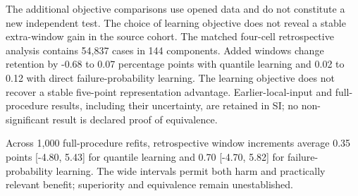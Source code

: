 The additional objective comparisons use opened data and do not constitute a new independent test. The choice of learning objective does not reveal a stable extra-window gain in the source cohort. The matched four-cell retrospective analysis contains 54,837 cases in 144 components. Added windows change retention by -0.68 to 0.07 percentage points with quantile learning and 0.02 to 0.12 with direct failure-probability learning. The learning objective does not recover a stable five-point representation advantage. Earlier-local-input and full-procedure results, including their uncertainty, are retained in SI; no non-significant result is declared proof of equivalence.

Across 1,000 full-procedure refits, retrospective window increments average 0.35 points [-4.80, 5.43] for quantile learning and 0.70 [-4.70, 5.82] for failure-probability learning. The wide intervals permit both harm and practically relevant benefit; superiority and equivalence remain unestablished.
